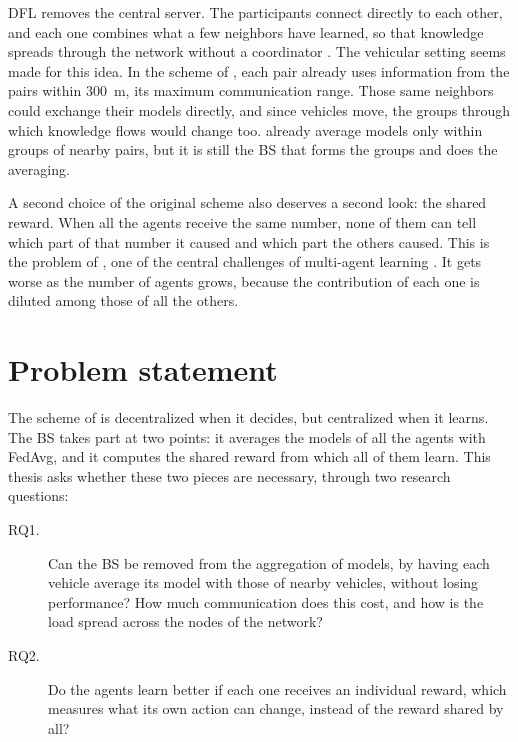 \Ac{DFL} removes the central server. The participants connect directly to each other, and each one combines
what a few neighbors have learned, so that knowledge spreads through the network without a coordinator
\cite{lian+17dpsgd,hegedus+19gossip,ge+24dfl}. The vehicular setting seems made for this idea. In the scheme
of \citet{li+22fedmarl}, each pair already uses information from the pairs within \SI{300}{\meter}, its
maximum communication range. Those same neighbors could exchange their models directly, and since vehicles
move, the groups through which knowledge flows would change too. \citet{zhang+20v2xfed} already average
models only within groups of nearby pairs, but it is still the \ac{BS} that forms the groups and does the
averaging.

A second choice of the original scheme also deserves a second look: the shared reward. When all the agents
receive the same number, none of them can tell which part of that number it caused and which part the
others caused. This is the problem of , one of the central challenges of
multi-agent learning \cite{wolpert+01collectives,agogino+08rewards,gronauer+22marlsurvey}. It gets worse as
the number of agents grows, because the contribution of each one is diluted among those of all the others.

\section{Problem statement}
\label{sec:intro-problem}

The scheme of \citet{li+22fedmarl} is decentralized when it decides, but centralized when it learns. The
\ac{BS} takes part at two points: it averages the models of all the agents with \ac{FedAvg}, and it computes
the shared reward from which all of them learn. This thesis asks whether these two pieces are necessary,
through two research questions:

\begin{description}
  \item[RQ1.] Can the \ac{BS} be removed from the aggregation of models, by having each vehicle average its
    model with those of nearby vehicles, without losing performance? How much communication does this cost,
    and how is the load spread across the nodes of the network?
  \item[RQ2.] Do the agents learn better if each one receives an individual reward, which measures what its
    own action can change, instead of the reward shared by all?
\end{description}

